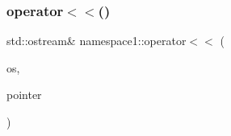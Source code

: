 \mbox{\label{namespacenamespace1_ac377ddc8113167c034b1e3d7a7c6262d}} 
\subsubsection{\texorpdfstring{operator$<$$<$()}{operator<<()}\hspace{0.1cm}{\footnotesize\ttfamily [2/2]}}
{\footnotesize\ttfamily std\+::ostream\& namespace1\+::operator$<$$<$ (\begin{DoxyParamCaption}\item[{std\+::ostream \&}]{os,  }\item[{const \mbox{\hyperlink{classnamespace1_1_1MyTypeInNameSpace1}{My\+Type\+In\+Name\+Space1}} $\ast$}]{pointer }\end{DoxyParamCaption})}

